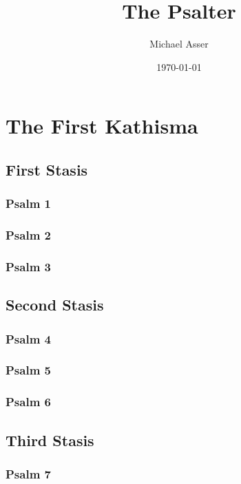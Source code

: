 \documentclass[12pt]{book}
\title{The Psalter}
\author{Michael Asser}
\date{\today}
\newcommand{\kathismabreak}{
  \medskip
  \begin{center}
  \begin{footnotesize}
  

  

  

  
  \end{footnotesize}
  \end{center}
  \smallbreak
}
\begin{document}
\section{The First Kathisma}

\subsection{First Stasis}

\subsubsection{Psalm 1}



\subsubsection{Psalm 2}


\subsubsection{Psalm 3}


\kathismabreak

\subsection{Second Stasis}

\subsubsection{Psalm 4}


\subsubsection{Psalm 5}


\subsubsection{Psalm 6}


\kathismabreak

\subsection{Third Stasis}

\subsubsection{Psalm 7}

\end{document}
